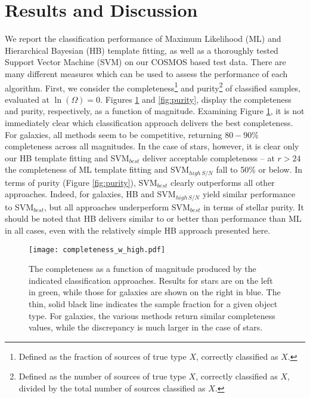 \documentclass[12pt,preprint]{aastex}
\begin{document}
\section{Results and Discussion}
\label{sec:results}

We report the classification performance of Maximum Likelihood (ML) 
and Hierarchical Bayesian (HB) template fitting, as well as a thoroughly 
tested Support Vector Machine (SVM) on our COSMOS based test data.  
There are many different measures which can be used to assess the 
performance of each algorithm.  First, we consider the 
completeness\footnote{Defined as the fraction of sources of true type $X$, 
correctly classified as $X$.} and purity\footnote{Defined as the number of 
sources of true type $X$, correctly classified as $X$, divided by the 
total number of sources classified as $X$.} of classified samples, 
evaluated at $\ln(\Omega)=0$.  Figures \ref{fig:completeness} and 
\ref{fig:purity}, display the completeness and purity, respectively, as a 
function of magnitude.  Examining Figure \ref{fig:completeness}, it is not 
immediately clear which classification approach delivers the best 
completeness.  For galaxies, all methods seem to be competitive, returning 
$80-90\%$ completeness across all magnitudes.  In the case of stars, 
however, it is clear only our HB template fitting and SVM$_{best}$  
deliver acceptable completeness -- at $r>24$ the completeness of 
ML template fitting and SVM$_{high\,S/N}$ fall to 50\% or below.  In terms of 
purity (Figure \ref{fig:purity}), SVM$_{best}$ clearly outperforms all other approaches.  Indeed, for 
galaxies, HB and SVM$_{high\,S/N}$ yield similar performance to SVM$_{best}$, 
but all approaches underperform SVM$_{best}$ in terms of stellar purity.  It should 
be noted that HB delivers similar to or better than performance than ML in all cases, 
even with the relatively simple HB approach presented here.


\begin{figure}
\centering
\texttt{[image: completeness\_w\_high.pdf]}
\caption{The completeness as a function of magnitude produced by the indicated classification 
approaches.  Results for stars are on the left in green, while those for galaxies are shown on the 
right in blue.  The thin, solid black line indicates the sample fraction for a given object type.  
For galaxies, the various methods return similar completeness values, while the discrepancy is 
much larger in the case of stars.}
\label{fig:completeness}
\end{figure}
\end{document}
